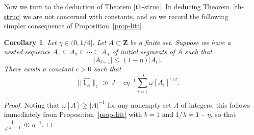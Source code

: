 \documentclass[reqno]{amsart}
\newcommand{\anorm}[1]{\| \widehat{#1}\|}
\renewcommand{\leq}{\leqslant}
\renewcommand{\geq}{\geqslant}
\newcommand{\ind}[1]{1_{#1}}
\newcommand{\bbz}{\mathbf{Z}}
\newcommand{\abs}[1]{\left\lvert #1\right\rvert}
\numberwithin{equation}{section}
\newtheorem{corollary}[theorem]{Corollary}
\theoremstyle{definition}
\theoremstyle{remark}
\begin{document}
Now we turn to the deduction of Theorem \ref{th-struc}.
In deducing Theorem~\ref{th-struc} we are not concerned with constants, and so we record the following simpler consequence of Proposition~\ref{prop-litt}.

\begin{corollary}\label{cor-litt}
Let $\eta\in(0,1/4]$. Let $A\subset\bbz$ be a finite set. Suppose we have a nested sequence $A_1\subseteq A_2\subseteq \cdots \subseteq A_J$ of initial segments of $A$
such that
\[\abs{A_{i-1}}\leq (1-\eta)\abs{A_i}.\]
There exists a constant $c>0$ such that 
\[\anorm{\ind{A}}_1\gg J -c\eta^{-1} \sum_{i = 1}^J  \omega[A_i]^{1/2}.\]
\end{corollary}
\begin{proof}
Noting that $\omega[A] \geq |A|^{-1}$ for any nonempty set $A$ of integers, this follows immediately from Proposition~\ref{prop-litt} with $b=1$ and $1/\lambda=1-\eta$, so that $\frac{1}{\sqrt{\lambda} - 1} \ll \eta^{-1}$.
\end{proof}
\end{document}
